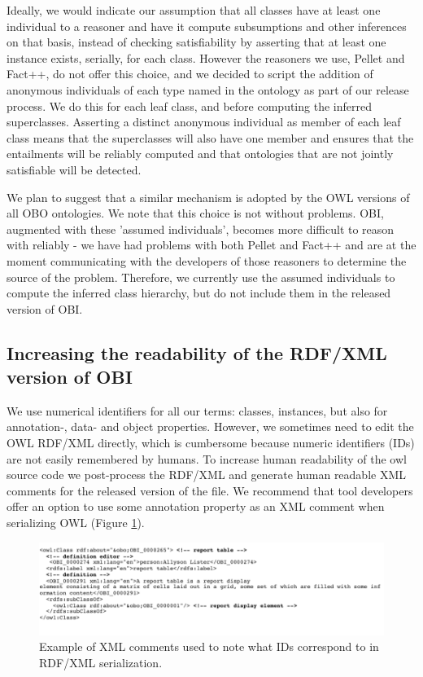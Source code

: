 \documentclass{elsart}       %
\begin{document}
Ideally, we would indicate our assumption that all classes have at least one individual to a reasoner and have it compute subsumptions and other inferences on that basis, instead of checking satisfiability by asserting that at least one instance exists, serially, for each class.
However the reasoners we use, Pellet\cite{pellet} and Fact++\cite{fact}, do not offer this choice, and we decided to script the addition of anonymous individuals of each type named in the ontology as part of our release process.
We do this for each leaf class, and before computing the inferred superclasses.
Asserting a distinct anonymous individual as member of each leaf class means that the superclasses will also have one member and ensures that the entailments will be reliably computed and that ontologies that are not jointly satisfiable will be detected.

We plan to suggest that a similar mechanism is adopted by the OWL versions of all OBO ontologies.
We note that this choice is not without problems.
OBI, augmented with these 'assumed individuals', becomes more difficult to reason with reliably - we have had problems with both Pellet and Fact++ and are at the moment communicating with the developers of those reasoners to determine the source of the problem. %
Therefore, we currently use the assumed individuals to compute the inferred class hierarchy, but do not include them in the released version of OBI.

\subsection{Increasing the readability of the RDF/XML version of OBI}

We use numerical identifiers for all our terms: classes, instances, but also for annotation-, data- and object properties.
However, we sometimes need to edit the OWL RDF/XML directly, which is cumbersome because numeric identifiers (IDs) are not easily remembered by humans.
To increase human readability of the owl source code we post-process the RDF/XML and generate human readable XML comments for the released version of the file.
We recommend that tool developers offer an option to use some annotation property as an XML comment when serializing OWL (Figure \ref{fig:comments}).  

\begin{figure}[t]
\centering \includegraphics*[width=1\columnwidth]{comments}
\caption{Example of XML comments used to note what IDs correspond to in RDF/XML serialization.}
\label{fig:comments}
\end{figure}
\end{document}

